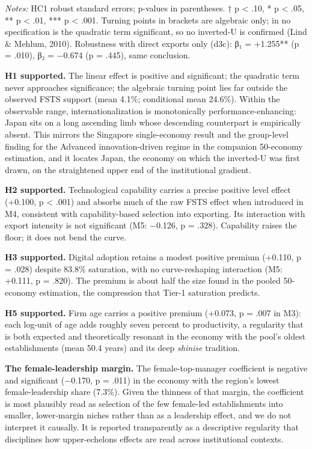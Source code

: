\documentclass[
  12pt,a4paper]{article}
\begin{document}
\emph{Notes:} HC1 robust standard errors; p-values in parentheses. † p
\textless{} .10, * p \textless{} .05, ** p \textless{} .01, *** p
\textless{} .001. Turning points in brackets are algebraic only; in no
specification is the quadratic term significant, so no inverted-U is
confirmed (Lind \& Mehlum, 2010). Robustness with direct exports only
(d3c): β₁ = +1.255** (p = .010), β₂ = −0.674 (p = .445), same
conclusion.

\textbf{H1 supported.} The linear effect is positive and significant;
the quadratic term never approaches significance; the algebraic turning
point lies far outside the observed FSTS support (mean 4.1\%;
conditional mean 24.6\%). Within the observable range,
internationalization is monotonically performance-enhancing: Japan sits
on a long ascending limb whose descending counterpart is empirically
absent. This mirrors the Singapore single-economy result and the
group-level finding for the Advanced innovation-driven regime in the
companion 50-economy estimation, and it locates Japan, the economy on
which the inverted-U was first drawn, on the straightened upper end of
the institutional gradient.

\textbf{H2 supported.} Technological capability carries a precise
positive level effect (+0.100, p \textless{} .001) and absorbs much of
the raw FSTS effect when introduced in M4, consistent with
capability-based selection into exporting. Its interaction with export
intensity is not significant (M5: −0.126, p = .328). Capability raises
the floor; it does not bend the curve.

\textbf{H3 supported.} Digital adoption retains a modest positive
premium (+0.110, p = .028) despite 83.8\% saturation, with no
curve-reshaping interaction (M5: +0.111, p = .820). The premium is about
half the size found in the pooled 50-economy estimation, the compression
that Tier-1 saturation predicts.

\textbf{H5 supported.} Firm age carries a positive premium (+0.073, p =
.007 in M3): each log-unit of age adds roughly seven percent to
productivity, a regularity that is both expected and theoretically
resonant in the economy with the pool's oldest establishments (mean 50.4
years) and its deep \emph{shinise} tradition.

\textbf{The female-leadership margin.} The female-top-manager
coefficient is negative and significant (−0.170, p = .011) in the
economy with the region's lowest female-leadership share (7.3\%). Given
the thinness of that margin, the coefficient is most plausibly read as
selection of the few female-led establishments into smaller,
lower-margin niches rather than as a leadership effect, and we do not
interpret it causally. It is reported transparently as a descriptive
regularity that disciplines how upper-echelons effects are read across
institutional contexts.
\end{document}
